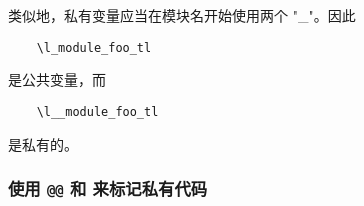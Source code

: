 \documentclass{l3doc}
\begin{document}
%
%

类似地，私有变量应当在模块名开始使用两个 "_"。因此
\begin{verbatim}
    \l_module_foo_tl
\end{verbatim}
是公共变量，而
\begin{verbatim}
    \l__module_foo_tl
\end{verbatim}
是私有的。

\subsubsection{使用 \texttt{@@} 和  来标记私有代码}

%
\end{document}
